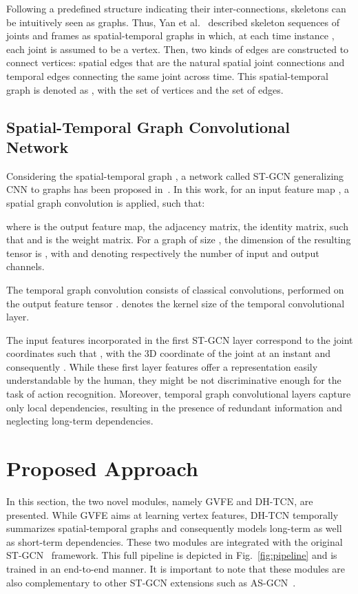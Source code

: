 \documentclass{article}
\begin{document}
Following a predefined structure indicating their inter-connections, skeletons can be intuitively seen as graphs. Thus, Yan et al.~\cite{yan2018spatial} described skeleton sequences of  joints and  frames as spatial-temporal graphs in which, at each time instance , each joint  is assumed to be a vertex. Then, two kinds of edges are constructed to connect vertices: spatial edges that are the natural spatial joint connections and temporal edges connecting the same joint across time.  This spatial-temporal graph is denoted as , with  the set of vertices and  the set of edges.


\subsection{Spatial-Temporal Graph Convolutional Network}

Considering the spatial-temporal graph , a network called ST-GCN generalizing CNN to graphs has been proposed in~\cite{yan2018spatial}. 
In this work, for an input feature map , a spatial graph convolution is applied, such that: 




\noindent where  is the output feature map,  the adjacency matrix,  the identity matrix,  such that  and  is the weight matrix. For a graph of size , the dimension of the resulting tensor is , with  and  denoting respectively the number of input and output channels.

The temporal graph convolution consists of classical convolutions, performed on the output feature tensor .  denotes the kernel size of the temporal convolutional layer.

The input features  incorporated in the first ST-GCN layer correspond to the joint coordinates such that ,  with  the 3D coordinate of the joint  at an instant  and consequently . While these first layer features   offer a representation easily understandable by the human, they might be not discriminative enough for the task of action recognition. Moreover, temporal graph convolutional layers capture only local dependencies, resulting in the presence of redundant information and neglecting long-term dependencies. 



\section{Proposed Approach}
\label{sec:pipeline}

In this section, the two novel modules, namely GVFE and DH-TCN, are presented. While GVFE aims at learning vertex features, DH-TCN temporally summarizes spatial-temporal graphs and consequently models long-term as well as short-term dependencies. These two modules are integrated with the original ST-GCN~\cite{yan2018spatial} framework. This full pipeline is depicted in Fig.~\ref{fig:pipeline} and is trained in an end-to-end manner. It is important to note that these modules are also complementary to other ST-GCN extensions such as AS-GCN~\cite{li2019actional}.
\end{document}
